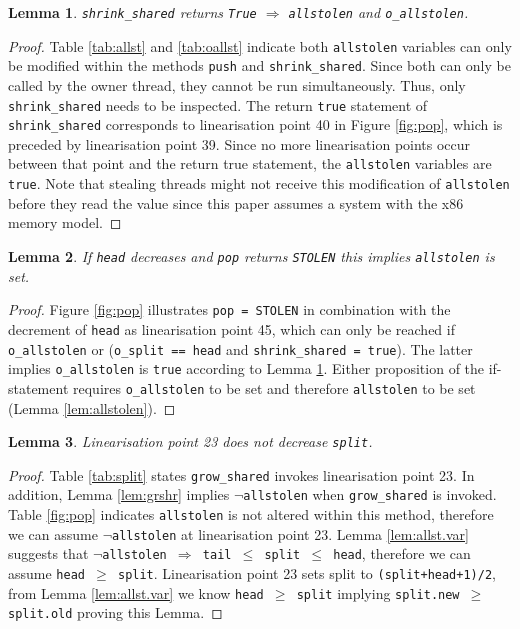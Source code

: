 \documentclass{sig-alternate-br}
\newtheorem{lemma}{Lemma}
\begin{document}
\begin{lemma}
	\texttt{shrink\_shared} returns \texttt{True} $\Rightarrow$ \texttt{allstolen} and \texttt{o\_allstolen}.
	\label{lem:shrinkshared}
\end{lemma}
\begin{proof}
	Table \ref{tab:allst} and \ref{tab:oallst} indicate both \texttt{allstolen} variables can only be modified within the methods \texttt{push} and \texttt{shrink\_shared}. Since both can only be called by the owner thread, they cannot be run simultaneously.  Thus, only \texttt{shrink\_shared} needs to be inspected. The return \texttt{true} statement of \texttt{shrink\_shared} corresponds to linearisation point 40 in Figure \ref{fig:pop}, which is preceded by linearisation point 39. Since no more linearisation points occur between that point and the return true statement, the \texttt{allstolen} variables are \texttt{true}. Note that stealing threads might not receive this modification of \texttt{allstolen} before they read the value since this paper assumes a system with the x86 memory model.
\end{proof}

\begin{lemma}
	If \texttt{head} decreases and \texttt{pop} returns \texttt{STOLEN} this implies \texttt{allstolen} is set.
	\label{lem:popstolen}
\end{lemma}
\begin{proof}
	Figure \ref{fig:pop} illustrates \texttt{pop = STOLEN} in combination with the decrement of \texttt{head} as linearisation point 45, which can only be reached if \texttt{o\_allstolen} or (\texttt{o\_split == head} and \texttt{shrink\_shared = true}).
	The latter implies \texttt{o\_allstolen} is \texttt{true} according to Lemma \ref{lem:shrinkshared}.
	Either proposition of the if-statement requires \texttt{o\_allstolen} to be set and therefore \texttt{allstolen} to be set (Lemma \ref{lem:allstolen}).
\end{proof}

\begin{lemma}
	Linearisation point 23 does not decrease \texttt{split}.
	\label{lem:growincrsplit}
\end{lemma}
\begin{proof}
	Table \ref{tab:split} states \texttt{grow\_shared} invokes linearisation point 23.
	In addition, Lemma \ref{lem:grshr} implies \texttt{$\neg$allstolen} when \texttt{grow\_shared} is invoked.
	Table \ref{fig:pop} indicates \texttt{allstolen} is not altered within this method, therefore we can assume \texttt{$\neg$allstolen} at linearisation point 23.
	Lemma \ref{lem:allst.var} suggests that \texttt{$\neg$allstolen $\Rightarrow$ tail $\leq$ split $\leq$ head}, therefore we can assume \texttt{head $\geq$ split}.
	Linearisation point 23 sets split to \texttt{(split+head+1)/2}, from Lemma \ref{lem:allst.var} we know \texttt{head $\geq$ split} implying \texttt{split.new $\geq$ split.old} proving this Lemma.
\end{proof}
\end{document}
